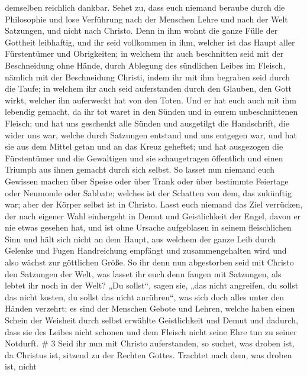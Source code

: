 demselben reichlich dankbar.  Sehet zu, dass euch niemand
beraube durch die Philosophie und lose Verführung nach der Menschen
Lehre und nach der Welt Satzungen, und nicht nach Christo. 
Denn in ihm wohnt die ganze Fülle der Gottheit leibhaftig, 
und ihr seid vollkommen in ihm, welcher ist das Haupt aller Fürstentümer
und Obrigkeiten;  in welchem ihr auch beschnitten seid mit
der Beschneidung ohne Hände, durch Ablegung des sündlichen Leibes im
Fleisch, nämlich mit der Beschneidung Christi,  indem ihr
mit ihm begraben seid durch die Taufe; in welchem ihr auch seid
auferstanden durch den Glauben, den Gott wirkt, welcher ihn auferweckt
hat von den Toten.  Und er hat euch auch mit ihm lebendig
gemacht, da ihr tot waret in den Sünden und in eurem unbeschnittenen
Fleisch; und hat uns geschenkt alle Sünden  und ausgetilgt
die Handschrift, die wider uns war, welche durch Satzungen entstand und
uns entgegen war, und hat sie aus dem Mittel getan und an das Kreuz
geheftet;  und hat ausgezogen die Fürstentümer und die
Gewaltigen und sie schaugetragen öffentlich und einen Triumph aus ihnen
gemacht durch sich selbst.  So lasset nun niemand euch
Gewissen machen über Speise oder über Trank oder über bestimmte
Feiertage oder Neumonde oder Sabbate;  welches ist der
Schatten von dem, das zukünftig war; aber der Körper selbst ist in
Christo.  Lasst euch niemand das Ziel verrücken, der nach
eigener Wahl einhergeht in Demut und Geistlichkeit der Engel, davon er
nie etwas gesehen hat, und ist ohne Ursache aufgeblasen in seinem
fleischlichen Sinn  und hält sich nicht an dem Haupt, aus
welchem der ganze Leib durch Gelenke und Fugen Handreichung empfängt und
zusammengehalten wird und also wächst zur göttlichen Größe.
 So ihr denn nun abgestorben seid mit Christo den Satzungen
der Welt, was lasset ihr euch denn fangen mit Satzungen, als lebtet ihr
noch in der Welt?  „Du sollst``, sagen sie, „das nicht
angreifen, du sollst das nicht kosten, du sollst das nicht anrühren``,
 was sich doch alles unter den Händen verzehrt; es sind der
Menschen Gebote und Lehren,  welche haben einen Schein der
Weisheit durch selbst erwählte Geistlichkeit und Demut und dadurch, dass
sie des Leibes nicht schonen und dem Fleisch nicht seine Ehre tun zu
seiner Notdurft. \# 3  Seid ihr nun mit Christo
auferstanden, so suchet, was droben ist, da Christus ist, sitzend zu der
Rechten Gottes.  Trachtet nach dem, was droben ist, nicht
